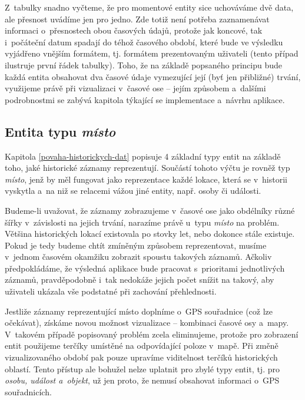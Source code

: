 		 Z~tabulky snadno vyčteme, že pro momentové entity sice uchováváme dvě data, ale přesnost uvádíme jen pro jedno. Zde totiž není potřeba zaznamenávat informaci o~přesnostech obou časových údajů, protože jak koncové, tak i~počáteční datum spadají do téhož časového období, které bude ve výsledku vyjádřeno vnějším formátem, tj. formátem prezentovaným uživateli (tento případ ilustruje první řádek tabulky). Toho, že na základě popsaného principu bude každá entita obsahovat dva časové údaje vymezující její (byť jen přibližné) trvání, využijeme právě při vizualizaci v~časové ose -- jejím způsobem a~dalšími podrobnostmi se zabývá kapitola týkající se implementace a~návrhu aplikace.
			
		\subsection{Entita typu \emph{místo}}
		\label{misto-entita}
		
			Kapitola \ref{povaha-historickych-dat} popisuje 4 základní typy entit na základě toho, jaké historické záznamy reprezentují. Součástí tohoto výčtu je rovněž typ \emph{místo}, jenž by měl fungovat jako reprezentace každé lokace, která se v~historii vyskytla a~na niž se relacemi vážou jiné entity, např. osoby či události.
			
			Budeme-li uvažovat, že záznamy zobrazujeme v~časové ose jako obdélníky různé šířky v~závislosti na jejich trvání, narazíme právě u~typu \emph{místo} na problém. Většina historických lokací existovala po stovky let, nebo dokonce stále existuje. Pokud je tedy budeme chtít zmíněným způsobem reprezentovat, musíme v~jednom časovém okamžiku zobrazit spoustu takových záznamů. Ačkoliv předpokládáme, že výsledná aplikace bude pracovat s~prioritami jednotlivých záznamů, pravdě\-podobně i~tak nedokáže jejich počet snížit na takový, aby uživateli ukázala vše podstatné při zachování přehlednosti.
			
			Jestliže záznamy reprezentující místo doplníme o~GPS souřadnice (což lze očekávat), získáme novou možnost vizualizace -- kombinaci časové osy a~mapy. V~takovém případě popisovaný problém zcela eliminujeme, protože pro zobrazení entit použijeme terčíky umístěné na odpovídající poloze v~mapě. Při změně vizualizovaného období pak pouze upravíme viditelnost terčíků historických oblastí. Tento přístup ale bohužel nelze uplatnit pro zbylé typy entit, tj. pro \emph{osobu, událost a~objekt}, už jen proto, že nemusí obsahovat informaci o~GPS souřadnicích.